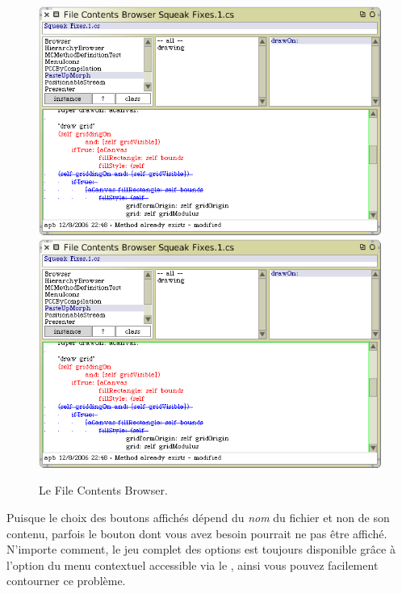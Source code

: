 \documentclass[a4paper,10pt,twoside]{book}
\begin{document}
\begin{figure}[btp]
	\begin{center}
	\ifluluelse
		{\includegraphics[width=\textwidth]{fileContentsBrowser}}
		{\includegraphics[scale=0.7]{fileContentsBrowser}}
	\end{center}
	\caption{Le File Contents Browser.}
	\label{fig:fileContentsBrowser}
\end{figure}

Puisque le choix des boutons affich\'es d\'epend du \emph{nom} du fichier et
non de son contenu, parfois le bouton dont vous avez besoin pourrait ne pas \^etre
affich\'e.
N'importe comment, le jeu complet des options est toujours disponible gr\^ace
\`a l'option  du menu contextuel accessible via le ,
ainsi vous pouvez facilement contourner ce probl\`eme.
\end{document}
